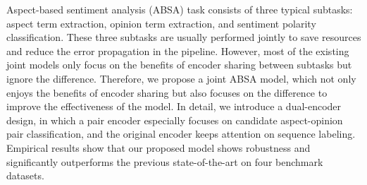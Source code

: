 Aspect-based sentiment analysis (ABSA) task consists of three typical subtasks: aspect term extraction, opinion term extraction, and sentiment polarity classification. These three subtasks are usually performed jointly to save resources and reduce the error propagation in the pipeline. However, most of the existing joint models only focus on the benefits of encoder sharing between subtasks but ignore the difference. Therefore, we propose a joint ABSA model, which not only enjoys the benefits of encoder sharing but also focuses on the difference to improve the effectiveness of the model. In detail, we introduce a dual-encoder design, in which a pair encoder especially focuses on candidate aspect-opinion pair classification, and the original encoder keeps attention on sequence labeling. Empirical results show that our proposed model shows robustness and significantly outperforms the previous state-of-the-art on four benchmark datasets.
